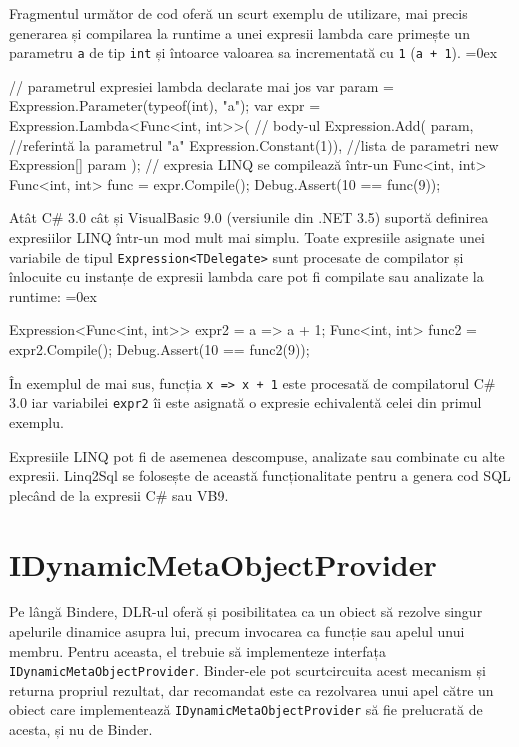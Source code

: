 \documentclass[12pt,a4paper]{memoir}
\renewcommand{\c}{\texttt}
\newenvironment{code}
{
\definecolor{shadecolor}{gray}{0.91}
\topsep=0ex
\relax
\shaded
\verbatim
}
{
\endverbatim
\endshaded
}
\begin{document}
Fragmentul următor de cod oferă un scurt exemplu de utilizare, mai precis generarea și compilarea la runtime a unei expresii lambda care primește un parametru \c{a} de tip \c{int} și întoarce valoarea sa incrementată cu \c{1} (\c{a + 1}).
\begin{code}
// parametrul expresiei lambda declarate mai jos
var param = Expression.Parameter(typeof(int), "a");
var expr =
  Expression.Lambda<Func<int, int>>(
    // body-ul
    Expression.Add(
      param, //referintă la parametrul "a"
      Expression.Constant(1)),
    //lista de parametri
    new Expression[] { param });
// expresia LINQ se compilează într-un Func<int, int>
Func<int, int> func = expr.Compile();
Debug.Assert(10 == func(9));
\end{code}

Atât C\# 3.0 cât și VisualBasic 9.0 (versiunile din .NET 3.5) suportă definirea expresiilor LINQ într-un mod mult mai simplu. Toate expresiile asignate unei variabile de tipul \c{Expression<TDelegate>} sunt procesate de compilator și înlocuite cu instanțe de expresii lambda care pot fi compilate sau analizate la runtime:
\begin{code}
Expression<Func<int, int>> expr2 = a => a + 1;
Func<int, int> func2 = expr2.Compile();
Debug.Assert(10 == func2(9));
\end{code}
În exemplul de mai sus, funcția \c{x => x + 1} este procesată de compilatorul C\# 3.0 iar variabilei \c{expr2} îi este asignată o expresie echivalentă celei din primul exemplu.

Expresiile LINQ pot fi de asemenea descompuse, analizate sau combinate cu alte expresii. Linq2Sql se folosește de această funcționalitate pentru a genera cod SQL plecând de la expresii C\# sau VB9.

\section{IDynamicMetaObjectProvider}\label{sec:IDynamicMetaObjectProvider}

Pe lângă Bindere, DLR-ul oferă și posibilitatea ca un obiect să rezolve singur apelurile dinamice asupra lui, precum invocarea ca funcție sau apelul unui membru. Pentru aceasta, el trebuie să implementeze interfața \\ \c{IDynamicMetaObjectProvider}\cite{i_dynamic_meta_object_provider}. Binder-ele pot scurtcircuita acest mecanism și returna propriul rezultat, dar recomandat este ca rezolvarea unui apel către un obiect care implementează \c{IDynamicMetaObjectProvider} să fie prelucrată de acesta, și nu de Binder.
\end{document}
